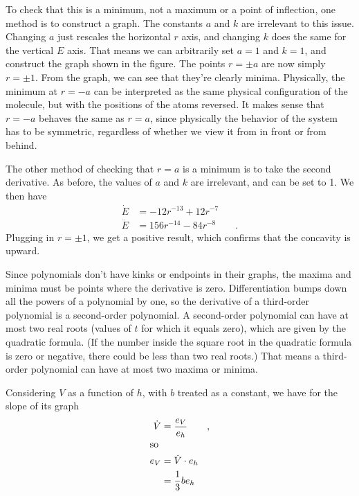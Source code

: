 To check that this is a minimum, not a maximum or a point of inflection, one method is to construct a graph. The constants
$a$ and $k$ are irrelevant to this issue. Changing $a$ just rescales the horizontal $r$ axis, and changing $k$ does the
same for the vertical $E$ axis. That means we can arbitrarily set $a=1$ and $k=1$, and construct the graph shown in the figure.
The points $r = \pm a$ are now simply $r=\pm 1$. From the graph, we can see that they're clearly minima. Physically, the
minimum at $r=-a$ can be interpreted as the same physical configuration of the molecule, but with the positions of the atoms
reversed. It makes sense that $r=-a$ behaves the same as $r=a$, since physically the behavior of the system has to be symmetric,
regardless of whether we view it from in front or from behind.


The other method of checking that $r=a$ is a minimum is to take the second derivative. As before, the values of $a$ and
$k$ are irrelevant, and can be set to 1. We then have
\begin{align*}
 \dot{E} &= -12r^{-13}+12r^{-7} \\
 \ddot{E} &= 156r^{-14}-84r^{-8}  \qquad .
\end{align*}
Plugging in $r=\pm 1$, we get a positive result, which confirms that the concavity is upward.


Since polynomials don't have kinks or endpoints in their graphs, the maxima and minima must be points where the
derivative is zero. Differentiation bumps down all the powers of a polynomial by one, so 
the derivative of a third-order polynomial is a second-order polynomial. A second-order polynomial
can have at most two real roots (values of $t$ for which it equals zero), which are given by the
quadratic formula. (If the number inside the square root in the quadratic formula is zero or negative,
there could be less than two real roots.) That means a third-order polynomial can have at most two
maxima or minima.


Considering $V$ as a function of $h$, with $b$ treated as a constant, we have for the slope
of its graph
\begin{align*}
  \dot{V} &= \frac{e_V}{e_h} \qquad ,\\
\intertext{so}
  e_V &= \dot{V}\cdot e_h \\
      &= \frac{1}{3}b e_h
\end{align*}

